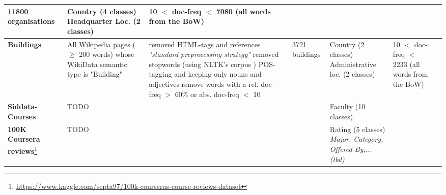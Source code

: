 {\begin{landscape}
\begin{table}[]
{\begin{tabular}{@{}lllllll@{}}
					11800 organisations &
					\specialcell[l]{ \tabitem Country (4 classes)\\ \tabitem Headquarter Loc. (2 classes)} &
					\specialcell[l]{ 10 $<$ doc-freq $<$ 7080 \\ (all words from the BoW)} \\ \midrule
				\textbf{Buildings\footnoteref{fnote:for_alshaikh2019} \cite{Alshaikh2020}} &
					\specialcell[l]{All Wikipedia pages ($\geq$ 200 words) whose \\ WikiData semantic type is "Building"} &
					\specialcell[l]{ \tabitem removed HTML-tags and references \\ \tabitem \textit{"standard preprocessing strategy"} \cite[137]{Alshaikh2019} \\ \tabitem removed stopwords (using NLTK's corpus \cite{loper-bird-2002-nltk})\\ \tabitem POS-tagging and keeping only nouns and adjectives \\ \tabitem remove words with a rel. doc-freq  $>$ 60\% or abs. doc-freq $<$ 10 } &
					3721 buildings &
					\specialcell[l]{ \tabitem Country (2 classes)\\ \tabitem Administrative loc. (2 classes)} &
					\specialcell[l]{10 $<$ doc-freq $<$ 2233 \\ (all words from the BoW) }\\ \midrule \midrule
				\textbf{Siddata-Courses} &
					TODO &
					&
					&
					\tabitem Faculty (10 classes) 
					\\ \midrule 
				\textbf{100K Coursera reviews}\footnote{\url{https://www.kaggle.com/septa97/100k-courseras-course-reviews-dataset}} &
					TODO &
					&
					&
					\specialcell[l]{ \tabitem Rating (5 classes) \\ \textit{\tabitem Major, Category, Offered-By,... (tbd)} }
					\\ 
			\end{tabular}
			\label{tab:all_datasets}
		}
	\end{table}
\end{landscape}	
\restoregeometry\clearpage %
\aftergroup\restoregeometry  %
} %
